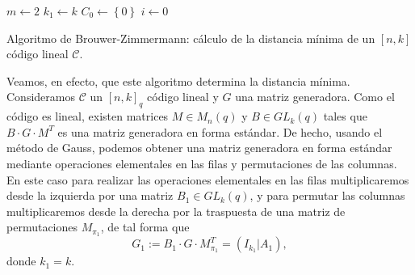 \begin{Ualgorithm}[H]
    \DontPrintSemicolon
    $m \longleftarrow 2$\;
    $k_1 \longleftarrow k$\;
    $C_0 \longleftarrow \left\lbrace 0 \right\rbrace$\;
    $i \longleftarrow 0$\;
    \caption{Algoritmo de Brouwer-Zimmermann: cálculo de la distancia mínima de un $[n,k]$ código lineal $\mathcal{C}$.}
\end{Ualgorithm}

Veamos, en efecto, que este algoritmo determina la distancia mínima. Consideramos $\mathcal{C}$ un $[n, k]_q$ código lineal y $G$ una matriz generadora. Como el código es lineal, existen matrices $M \in M_n(q)$ y $B \in GL_k(q)$ tales que $B \cdot G \cdot M^T$ es una matriz generadora en forma estándar. De hecho, usando el método de Gauss, podemos obtener una matriz generadora en forma estándar mediante operaciones elementales en las filas y permutaciones de las columnas. En este caso para realizar las operaciones elementales en las filas multiplicaremos desde la izquierda por una matriz $B_1 \in GL_k(q)$, y para permutar las columnas multiplicaremos desde la derecha por la traspuesta de una matriz de permutaciones $M_{\pi_1}$, de tal forma que
$$G_1 := B_1 \cdot G \cdot M_{\pi_1}^T = \left( I_{k_1} | A_1 \right),$$
donde $k_1 = k$.

